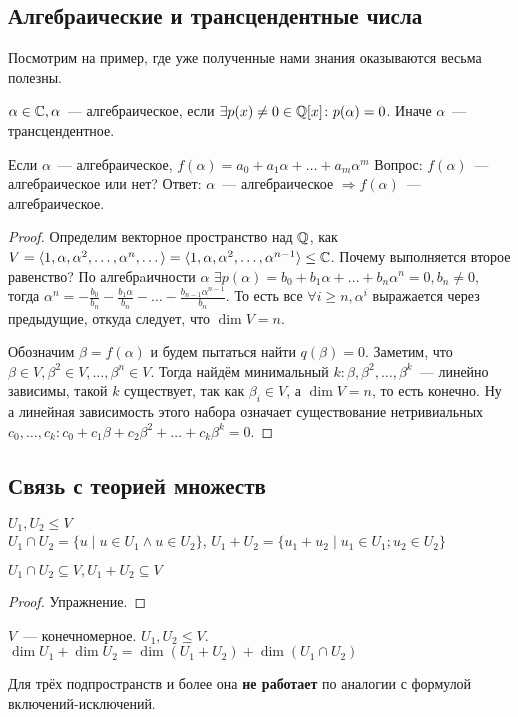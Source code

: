 \subsection{Алгебраические и трансцендентные числа}
\begin{motivation}
    Посмотрим на пример, где уже полученные нами знания оказываются весьма полезны.
\end{motivation} 
\begin{definition}
$\alpha\in\mathbb{C}, \alpha$~--- алгебраическое, если $\exists p(x)\not=0\in\mathbb{Q}[x] \colon p(\alpha)=0$.
Иначе $\alpha$~--- трансцендентное.
\end{definition}
Если $\alpha$~--- алгебраическое, $f(\alpha) = a_0 + a_1\alpha + \dots + a_m\alpha^m$
Вопрос: $f(\alpha)$~--- алгебраическое или нет?
Ответ:
$\alpha$~--- алгебраическое $\Rightarrow f(\alpha)$~--- алгебраическое.
\begin{proof}
    Определим векторное пространство над $\mathbb{Q}$, как 
    $V = \langle1, \alpha, \alpha^2,\dots,\alpha^n,\dots\rangle =
    \langle1, \alpha, \alpha^2,\dots,\alpha^{n-1}\rangle \le \mathbb{C}$.
    Почему выполняется второе равенство?
    По алгебрaичности $\alpha$ $\exists p(\alpha) = b_0+b_1\alpha+\dots+b_n\alpha^n = 0, b_n\not=0$, тогда
    $\alpha^n = -\frac{b_0}{b_n} - \frac{b_1\alpha}{b_n} - \dots - \frac{b_{n-1}\alpha^{n-1}}{b_n}$.
    То есть все $\forall i \ge n, \alpha^i$ выражается через предыдущие, откуда следует, что $\dim V = n$.

    Обозначим $\beta = f(\alpha)$ и будем пытаться найти $q(\beta)=0$.
    Заметим, что $\beta\in V, \beta^2\in V,\dots,\beta^n\in V$. 
    Тогда найдём минимальный $k: \beta,\beta^2,\dots,\beta^k$~--- линейно зависимы, такой $k$ существует,
    так как $\beta_i \in V$, а $\dim V = n$, то есть конечно.
    Ну а линейная зависимость этого набора означает существование нетривиальных 
    $c_0,\dots, c_k\colon c_0 + c_1\beta + c_2\beta^2 + \dots + c_k\beta^k=0$.
\end{proof}
\subsection{Связь с теорией множеств}
\begin{definition}
    $U_1, U_2\leq V$\\
    $U_1\cap U_2 = \{u \mid u\in U_1 \land u\in U_2\}$,
    $U_1+U_2 = \{u_1+u_2\mid u_1\in U_1; u_2\in U_2\}$
\end{definition}
\begin{statement}
    $U_1\cap U_2 \subseteq V, U_1 + U_2 \subseteq V$
\end{statement}
\begin{proof}
    Упражнение.
\end{proof}
\begin{theorem}
$V$~--- конечномерное. $U_1, U_2\leq V$. 
$\dim U_1 + \dim U_2 = \dim(U_1+U_2) + \dim(U_1\cap U_2)$
\end{theorem}
\begin{remark}
Для трёх подпространств и более она \textbf{не работает} по аналогии с формулой включений-исключений.
\end{remark}
